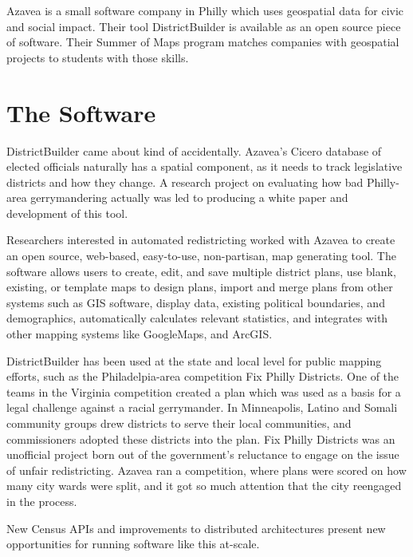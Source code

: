 


Azavea is a small software company in Philly which uses geospatial data for civic and social impact.  Their tool DistrictBuilder is available as an open source piece of software.  Their Summer of Maps program matches companies with geospatial projects to students with those skills.



\section*{The Software}
DistrictBuilder came about kind of accidentally.  Azavea's Cicero database of elected officials naturally has a spatial component, as it needs to track legislative districts and how they change.  A research project on evaluating how bad Philly-area gerrymandering actually was led to producing a white paper and development of this tool.

Researchers interested in automated redistricting worked with Azavea to create an open source, web-based, easy-to-use, non-partisan, map generating tool.  The software allows users to create, edit, and save multiple district plans, use blank, existing, or template maps to design plans, import and merge plans from other systems such as GIS software, display data, existing political boundaries, and demographics, automatically calculates relevant statistics, and integrates with other mapping systems like GoogleMaps, and ArcGIS.

DistrictBuilder has been used at the state and local level for public mapping efforts, such as the Philadelpia-area competition Fix Philly Districts.  One of the teams in the Virginia competition  created a plan which was used as a basis for a legal challenge against a racial gerrymander. In Minneapolis, Latino and Somali community groups drew districts to serve their local communities, and commissioners adopted these districts into the plan.  Fix Philly Districts was an unofficial project born out of the government's reluctance to engage on the issue of unfair redistricting.  Azavea ran a competition, where plans were scored on how many city wards were split, and it got so much attention that the city reengaged in the process.

New Census APIs and improvements to distributed architectures present new opportunities for running software like this at-scale.